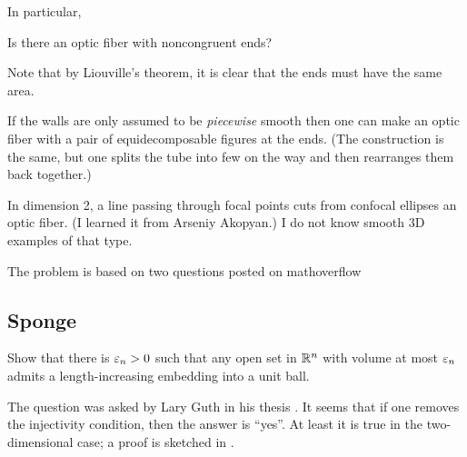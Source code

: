In particular, 

\begin{pr}
Is there an optic fiber with noncongruent ends?
\end{pr}

Note that by  Liouville's theorem, it is clear that the ends must have the same area.

If the walls are only assumed to be \emph{piecewise} smooth then one can make an optic fiber with a pair of equidecomposable figures at the ends.
(The construction is the same, but one splits the tube into few on the way and then rearranges them back together.) 

In dimension 2, a line passing through focal points cuts from confocal ellipses an optic fiber. (I learned it from Arseniy Akopyan.)  I do not know smooth 3D examples of that type.

The problem is based on two questions posted on mathoverflow \cite{rourke-optic, petrunin-optic}

\subsection*{Sponge}

\begin{pr}
Show that there is $\varepsilon_n>0$ such that any open set in $\mathbb{R}^n$ with volume at most $\varepsilon_n$ admits a length-increasing embedding into a unit ball.
\end{pr}

The question was asked by Lary Guth in his thesis \cite{guth-2005}.
It seems that if one removes the injectivity condition, then the answer is ``yes''.
At least it is true in the two-dimensional case; a proof is sketched in \cite{petrunin-guth}.
